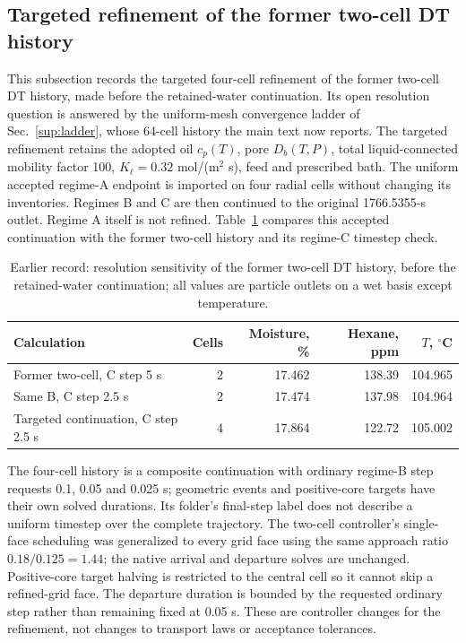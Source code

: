 \subsection{Targeted refinement of the former two-cell DT history}
\label{sup:currentDTrefinement}
This subsection records the targeted four-cell refinement of the former
two-cell DT history, made before the retained-water continuation. Its open
resolution question is answered by the uniform-mesh convergence ladder of
Sec.~\ref{sup:ladder}, whose 64-cell history the main text now reports.
The targeted refinement retains the adopted oil $c_p(T)$, pore $D_b(T,P)$,
total liquid-connected mobility factor 100, $K_\ell=0.32$ mol/(m$^2$ s),
feed and prescribed bath. The uniform accepted regime-A endpoint is imported
on four radial cells without changing its inventories. Regimes B and C
are then continued to the original 1766.5355-s outlet. Regime A itself is
not refined. Table~\ref{tab:sub:currentDTrefinement} compares this accepted
continuation with the former two-cell history and its regime-C timestep
check.

\begin{table}[htbp]\centering\small
\caption{Earlier record: resolution sensitivity of the former two-cell DT
history, before the retained-water continuation; all values are particle
outlets on a wet basis except temperature.}
\label{tab:sub:currentDTrefinement}
\begin{tabular}{@{}lrrrr@{}}\toprule
Calculation & Cells & Moisture, \% & Hexane, ppm & $T$, $^\circ$C\\\midrule
Former two-cell, C step 5 s & 2 & 17.462 & 138.39 & 104.965\\
Same B, C step 2.5 s & 2 & 17.474 & 137.98 & 104.964\\
Targeted continuation, C step 2.5 s & 4 & 17.864 & 122.72 & 105.002\\
\bottomrule\end{tabular}
\end{table}

The four-cell history is a composite continuation with ordinary regime-B
step requests 0.1, 0.05 and 0.025 s; geometric events and positive-core
targets have their own solved durations. Its folder's final-step label
does not describe a uniform timestep over the complete trajectory.
The two-cell controller's single-face scheduling was generalized to every
grid face using the same approach ratio $0.18/0.125=1.44$; the native
arrival and departure solves are unchanged. Positive-core target halving
is restricted to the central cell so it cannot skip a refined-grid face.
The departure duration is bounded by the requested ordinary step rather
than remaining fixed at 0.05 s. These are controller changes for the
refinement, not changes to transport laws or acceptance tolerances.

